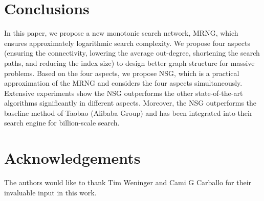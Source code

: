 \documentclass{vldb}
\begin{document}
\section{Conclusions}
\label{sec5}
In this paper, we propose a new monotonic search network, MRNG, which ensures approximately logarithmic search complexity. We propose four aspects (ensuring the connectivity, lowering the average out-degree, shortening the search paths, and reducing the index size) to design better graph structure for massive problems. Based on the four aspects, we propose NSG, which is a practical approximation of the MRNG and considers the four aspects simultaneously. Extensive experiments show the NSG outperforms the other state-of-the-art algorithms significantly in different aspects. Moreover, the NSG outperforms the baseline method of Taobao (Alibaba Group) and has been integrated into their search engine for billion-scale search.

\section{Acknowledgements}
The authors would like to thank Tim Weninger and Cami G Carballo for their invaluable input in this work.


%
\end{document}
